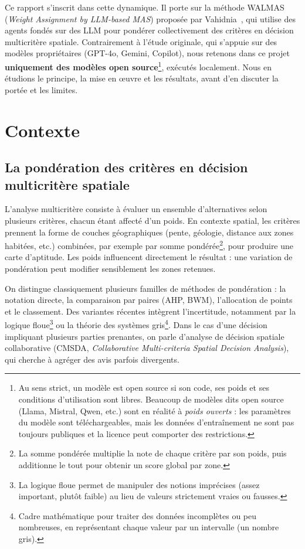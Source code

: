 \documentclass[11pt,a4paper]{article}
\begin{document}
Ce rapport s'inscrit dans cette dynamique. Il porte sur la méthode WALMAS (\emph{Weight Assignment by LLM-based MAS}) proposée par Vahidnia~\cite{vahidnia}, qui utilise des agents fondés sur des LLM pour pondérer collectivement des critères en décision multicritère spatiale. Contrairement à l'étude originale, qui s'appuie sur des modèles propriétaires (GPT-4o, Gemini, Copilot), nous retenons dans ce projet \textbf{uniquement des modèles open source}\footnote{Au sens strict, un modèle est open source si son code, ses poids et ses conditions d'utilisation sont libres. Beaucoup de modèles dits open source (Llama, Mistral, Qwen, etc.) sont en réalité à \emph{poids ouverts} : les paramètres du modèle sont téléchargeables, mais les données d'entraînement ne sont pas toujours publiques et la licence peut comporter des restrictions.}, exécutés localement. Nous en étudions le principe, la mise en œuvre et les résultats, avant d'en discuter la portée et les limites.

\section{Contexte}

\subsection{La pondération des critères en décision multicritère spatiale}

L'analyse multicritère consiste à évaluer un ensemble d'alternatives selon plusieurs critères, chacun étant affecté d'un poids. En contexte spatial, les critères prennent la forme de couches géographiques (pente, géologie, distance aux zones habitées, etc.) combinées, par exemple par somme pondérée\footnote{La somme pondérée multiplie la note de chaque critère par son poids, puis additionne le tout pour obtenir un score global par zone.}, pour produire une carte d'aptitude. Les poids influencent directement le résultat : une variation de pondération peut modifier sensiblement les zones retenues.

On distingue classiquement plusieurs familles de méthodes de pondération : la notation directe, la comparaison par paires (AHP, BWM), l'allocation de points et le classement. Des variantes récentes intègrent l'incertitude, notamment par la logique floue\footnote{La logique floue permet de manipuler des notions imprécises (assez important, plutôt faible) au lieu de valeurs strictement vraies ou fausses.} ou la théorie des systèmes gris\footnote{Cadre mathématique pour traiter des données incomplètes ou peu nombreuses, en représentant chaque valeur par un intervalle (un nombre gris).}. Dans le cas d'une décision impliquant plusieurs parties prenantes, on parle d'analyse de décision spatiale collaborative (CMSDA, \emph{Collaborative Multi-criteria Spatial Decision Analysis}), qui cherche à agréger des avis parfois divergents.
\end{document}
